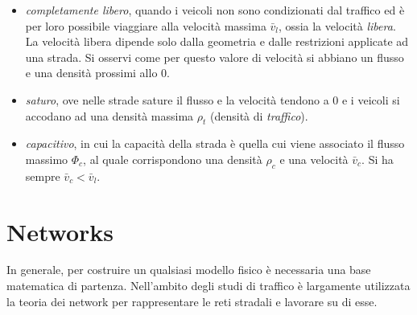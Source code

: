 \begin{itemize}
    \item \emph{completamente libero}, quando i veicoli non sono condizionati dal traffico ed \`e per loro possibile viaggiare alla velocit\`a massima $\bar{v}_l$, ossia la velocit\`a \emph{libera}.
        La velocit\`a libera dipende solo dalla geometria e dalle restrizioni applicate ad una strada.
        Si osservi come per questo valore di velocit\`a si abbiano un flusso e una densit\`a prossimi allo $0$.
    \item \emph{saturo}, ove nelle strade sature il flusso e la velocit\`a tendono a $0$ e i veicoli si accodano ad una densit\`a massima $\rho_t$ (densit\`a di \emph{traffico}).
    \item \emph{capacitivo}, in cui la capacit\`a della strada \`e quella cui viene associato il flusso massimo $\Phi_c$, al quale corrispondono una densit\`a $\rho_c$ e una velocit\`a $\bar{v}_c$.
        Si ha sempre $\bar{v}_c<\bar{v}_l$.
\end{itemize}

\section{Networks}
In generale, per costruire un qualsiasi modello fisico \`e necessaria una base matematica di partenza.
Nell'ambito degli studi di traffico \`e largamente utilizzata la teoria dei network per rappresentare le reti stradali e lavorare su di esse.

